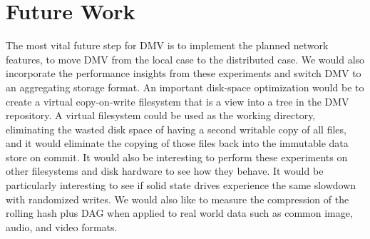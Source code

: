 \section{Future Work}

The most vital future step for DMV is to implement the planned network features, to move DMV from the local case to the distributed case.
We would also incorporate the performance insights from these experiments and switch DMV to an aggregating storage format.
An important disk-space optimization would be to create a virtual copy-on-write filesystem that is a view into a \gls{tree} in the \gls{DMV} repository.
A virtual filesystem could be used as the working directory, eliminating the wasted disk space of having a second writable copy of all files, and it would eliminate the copying of those files back into the immutable data store on \gls{commit}.
It would also be interesting to perform these experiments on other filesystems and disk hardware to see how they behave.
It would be particularly interesting to see if solid state drives experience the same slowdown with randomized writes.
We would also like to measure the compression of the rolling hash plus DAG when applied to real world data such as common image, audio, and video formats.
